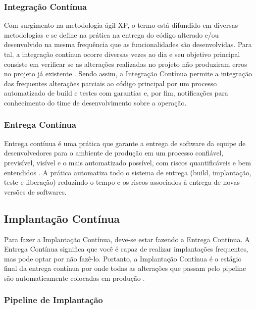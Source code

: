 \subsubsection{Integração Contínua}

Com surgimento na metodologia ágil XP, o termo está difundido em diversas metodologias e se define na prática na entrega do código alterado e/ou desenvolvido na mesma frequência que as funcionalidades são desenvolvidas. Para tal, a integração contínua ocorre diversas vezes ao dia e seu objetivo principal consiste em verificar se as alterações realizadas no projeto não produziram erros no projeto já existente \cite{beck2001planning}. Sendo assim, a Integração Contínua permite a integração das frequentes alterações parciais ao código principal por um processo automatizado de build e testes com garantias e, por fim, notificações para conhecimento do time de desenvolvimento sobre a operação.

\subsubsection{Entrega Contínua}

Entrega contínua é uma prática que garante a entrega de software da equipe de desenvolvedores para o ambiente de produção em um processo confiável, previsível, visível e o mais automatizado possível, com riscos quantificáveis e bem entendidos \cite{humble2010continuous}. A prática automatiza todo o sistema de entrega (build, implantação, teste e liberação) reduzindo o tempo e os riscos associados à entrega de novas versões de softwares.

\subsection{Implantação Contínua}

Para fazer a Implantação Contínua, deve-se estar fazendo a Entrega Contínua. A Entrega Contínua significa que você é capaz de realizar implantações frequentes, mas pode optar por não fazê-lo. Portanto, a Implantação Contínua é o estágio final da entrega contínua por onde todas as alterações que passam pelo pipeline são automaticamente colocadas em produção \cite{humble2010continuous}.

\subsubsection{Pipeline de Implantação}

